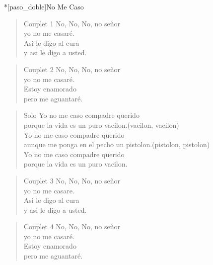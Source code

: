 \clearpage
\begin{song}*[paso_doble]{No Me Caso}
\begin{verse}{Couplet 1}
No, No, No, no se\~nor\\
yo no me casaré.\\
Asi le digo al cura\\
y asi le digo a usted.\\
\end{verse}
\begin{verse}{Couplet 2}
No, No, No, no se\~nor\\
yo no me casaré.\\
Estoy enamorado\\
pero me aguantaré.\\
\end{verse}

\begin{verse}{Solo}
 Yo no me caso compadre querido\\
porque la vida es un puro vacilon.\hspace{8em}(vacilon, vacilon)\\
\chord{\hspace{1pt}}Yo no me caso compadre querido\\
aunque me ponga en el pecho un pistolon.\hspace{3em}(pistolon, pistolon)\\
\chord{\hspace{1pt}}Yo no me caso compadre querido\\
porque la vida es un puro vacilon.\\
\end{verse}

\begin{verse}{Couplet 3}
No, No, No, no se\~nor\\
yo no me casare.\\
Asi le digo al cura\\
y asi le digo a usted.\\
\end{verse}
\begin{verse}{Couplet 4}
No, No, No, no se\~nor\\
yo no me casaré.\\
Estoy enamorado\\
pero me aguantaré.\\
\end{verse}
\end{song}

